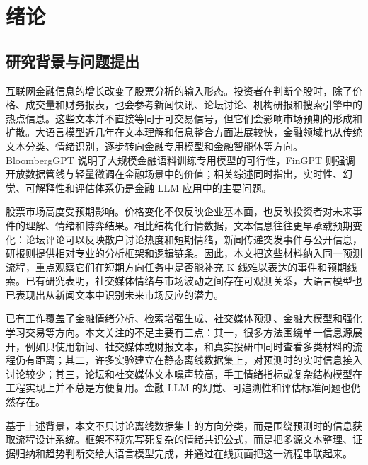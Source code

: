 
\chapter{绪论}

\section{研究背景与问题提出}

互联网金融信息的增长改变了股票分析的输入形态。投资者在判断个股时，除了价格、成交量和财务报表，也会参考新闻快讯、论坛讨论、机构研报和搜索引擎中的热点信息。这些文本并不直接等同于可交易信号，但它们会影响市场预期的形成和扩散。大语言模型近几年在文本理解和信息整合方面进展较快，金融领域也从传统文本分类、情绪识别，逐步转向金融专用模型和金融智能体等方向。BloombergGPT 说明了大规模金融语料训练专用模型的可行性，FinGPT 则强调开放数据管线与轻量微调在金融场景中的价值；相关综述同时指出，实时性、幻觉、可解释性和评估体系仍是金融 LLM 应用中的主要问题\citep{lee2024finllms,li2023llmfinance,nie2024llmfinancialapplications,yang2023fingpt,wu2023bloomberggpt}。

股票市场高度受预期影响。价格变化不仅反映企业基本面，也反映投资者对未来事件的理解、情绪和博弈结果。相比结构化行情数据，文本信息往往更早承载预期变化：论坛评论可以反映散户讨论热度和短期情绪，新闻传递突发事件与公开信息，研报则提供相对专业的分析框架和逻辑链条。因此，本文把这些材料纳入同一预测流程，重点观察它们在短期方向任务中是否能补充 K 线难以表达的事件和预期线索。已有研究表明，社交媒体情绪与市场波动之间存在可观测关系，大语言模型也已表现出从新闻文本中识别未来市场反应的潜力\citep{bollen2011twitter,lopezlira2023chatgptstock}。

已有工作覆盖了金融情绪分析、检索增强生成、社交媒体预测、金融大模型和强化学习交易等方向。本文关注的不足主要有三点：其一，很多方法围绕单一信息源展开，例如只使用新闻、社交媒体或财报文本，和真实投研中同时查看多类材料的流程仍有距离；其二，许多实验建立在静态离线数据集上，对预测时的实时信息接入讨论较少；其三，论坛和社交媒体文本噪声较高，手工情绪指标或复杂结构模型在工程实现上并不总是方便复用。金融 LLM 的幻觉、可追溯性和评估标准问题也仍然存在\citep{lewis2020rag,ye2024r2ag,lee2024finllms,li2023llmfinance,nie2024llmfinancialapplications,zhou2025expertopinion}。

基于上述背景，本文不只讨论离线数据集上的方向分类，而是围绕预测时的信息获取流程设计系统。框架不预先写死复杂的情绪共识公式，而是把多源文本整理、证据归纳和趋势判断交给大语言模型完成，并通过在线页面把这一流程串联起来。

